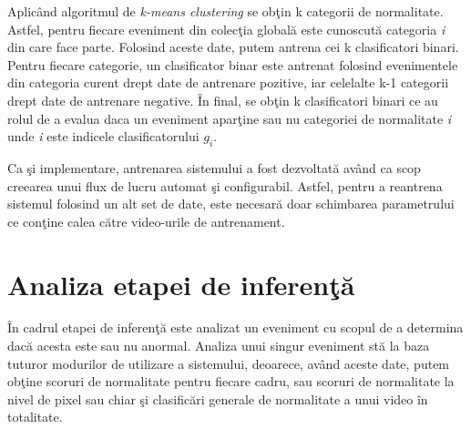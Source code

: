 \documentclass[a4paper,12pt]{report}
\begin{document}
\par
Aplicând algoritmul de \emph{k-means clustering} se obţin k categorii de normalitate. Astfel, pentru fiecare eveniment din colecţia globală este cunoscută categoria \emph{i} din care face parte. Folosind aceste date, putem antrena cei k clasificatori binari. Pentru fiecare categorie, un clasificator binar este antrenat folosind evenimentele din categoria curent drept date de antrenare pozitive, iar celelalte k-1 categorii drept date de antrenare negative. În final, se obţin k clasificatori binari ce au rolul de a evalua daca un eveniment aparţine sau nu categoriei de normalitate \emph{i} unde \emph{i} este indicele clasificatorului 
\emph{\(g_{i}\)}. 
\par Ca şi implementare, antrenarea sistemului a fost dezvoltată având ca scop creearea unui flux de lucru automat şi configurabil. Astfel, pentru a reantrena sistemul folosind un alt set de date, este necesară doar schimbarea parametrului ce conţine calea către video-urile de antrenament.
\section{Analiza etapei de inferenţă}
În cadrul etapei de inferenţă este analizat un eveniment cu scopul de a determina dacă acesta este sau nu anormal. Analiza unui singur eveniment stă la baza tuturor modurilor de utilizare a sistemului, deoarece, având aceste date, putem obţine scoruri de normalitate pentru fiecare cadru, sau scoruri de normalitate la nivel de pixel sau chiar şi clasificări generale de normalitate a unui video în totalitate.
\end{document}
